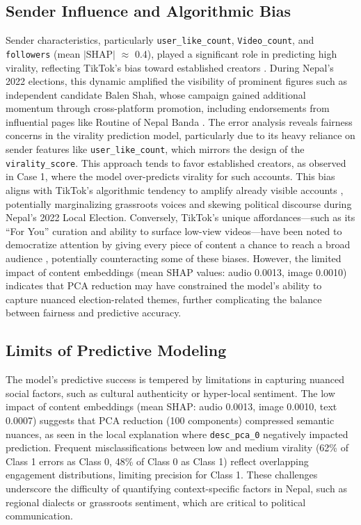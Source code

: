 \documentclass[12pt,a4paper]{report}
\begin{document}
\subsection{Sender Influence and Algorithmic Bias}

Sender characteristics, particularly \texttt{user\_like\_count}, \texttt{Video\_count}, and \texttt{followers} (mean $|\text{SHAP}|$ $\approx$ 0.4), played a significant role in predicting high virality, reflecting TikTok’s bias toward established creators \parencite{bucher2018ifthen}. During Nepal’s 2022 elections, this dynamic amplified the visibility of prominent figures such as independent candidate Balen Shah, whose campaign gained additional momentum through cross-platform promotion, including endorsements from influential pages like Routine of Nepal Banda \parencite{Kandel2024}.
\newpage
The error analysis reveals fairness concerns in the virality prediction model, particularly due to its heavy reliance on sender features like \texttt{user\_like\_count}, which mirrors the design of the \texttt{virality\_score}. This approach tends to favor established creators, as observed in Case 1, where the model over-predicts virality for such accounts. This bias aligns with TikTok’s algorithmic tendency to amplify already visible accounts \parencite{noble2018algorithms}, potentially marginalizing grassroots voices and skewing political discourse during Nepal’s 2022 Local Election. Conversely, TikTok’s unique affordances---such as its ``For You'' curation and ability to surface low-view videos---have been noted to democratize attention by giving every piece of content a chance to reach a broad audience \parencite{guinaudeau2022fifteen}, potentially counteracting some of these biases. However, the limited impact of content embeddings (mean SHAP values: audio 0.0013, image 0.0010) indicates that PCA reduction may have constrained the model’s ability to capture nuanced election-related themes, further complicating the balance between fairness and predictive accuracy.

\subsection{Limits of Predictive Modeling}
The model’s predictive success is tempered by limitations in capturing nuanced social factors, such as cultural authenticity or hyper-local sentiment. The low impact of content embeddings (mean SHAP: audio 0.0013, image 0.0010, text 0.0007) suggests that PCA reduction (100 components) compressed semantic nuances, as seen in the local explanation where \texttt{desc\_pca\_0} negatively impacted prediction. Frequent misclassifications between low and medium virality (62\% of Class 1 errors as Class 0, 48\% of Class 0 as Class 1) reflect overlapping engagement distributions, limiting precision for Class 1. These challenges underscore the difficulty of quantifying context-specific factors in Nepal, such as regional dialects or grassroots sentiment, which are critical to political communication.
\newpage
\end{document}
